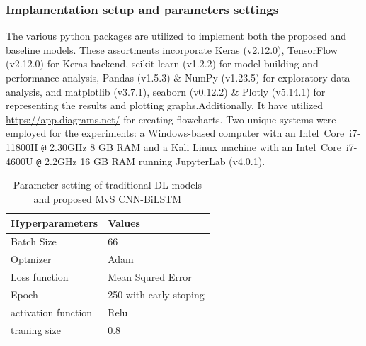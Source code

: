 \documentclass[a4paper,fleqn]{cas-sc}
\begin{document}
\subsubsection{Implamentation setup and parameters settings}
The various python packages are utilized to implement both the proposed and baseline models. These assortments incorporate Keras (v2.12.0), TensorFlow (v2.12.0) for Keras backend, scikit-learn (v1.2.2) for model building and performance analysis, Pandas (v1.5.3) \& NumPy (v1.23.5) for exploratory data analysis, and matplotlib (v3.7.1), seaborn (v0.12.2) \& Plotly (v5.14.1) for representing the results and plotting graphs.Additionally, It have utilized \href{https://app.diagrams.net/}{https://app.diagrams.net/} for creating flowcharts. Two unique systems were employed for the experiments: a Windows-based computer with an Intel\textregistered ~Core\texttrademark ~i7-11800H \texttt{@} 2.30GHz 8 GB RAM and a Kali Linux machine with an Intel\textregistered ~Core\texttrademark ~i7-4600U \texttt{@} 2.2GHz 16 GB RAM running JupyterLab (v4.0.1).


\begin{table}[h!]
  \caption{Parameter setting of traditional DL models and proposed MvS CNN-BiLSTM }
  \label{tab:my-table}
  \begin{tabular}{ll}
  \hline Hyperparameters & Values        \\ \hline
  Batch Size               & 66                     \\
  Optmizer                 & Adam                   \\
  Loss function            & Mean Squred Error      \\
  Epoch                    & 250 with early stoping \\
  activation function      & Relu                   \\
  traning size             & 0.8                   \\ \hline
  \end{tabular}
  \end{table}
\end{document}

